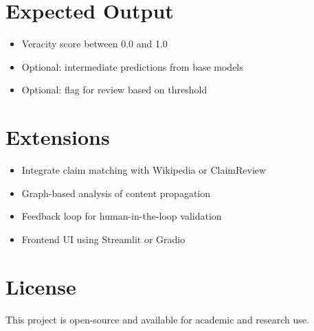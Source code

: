 \documentclass{article}
\begin{document}
\section*{Expected Output}
\begin{itemize}
  \item Veracity score between 0.0 and 1.0
  \item Optional: intermediate predictions from base models
  \item Optional: flag for review based on threshold
\end{itemize}

\section*{Extensions}
\begin{itemize}
  \item Integrate claim matching with Wikipedia or ClaimReview
  \item Graph-based analysis of content propagation
  \item Feedback loop for human-in-the-loop validation
  \item Frontend UI using Streamlit or Gradio
\end{itemize}

\section*{License}
This project is open-source and available for academic and research use.
\end{document}
